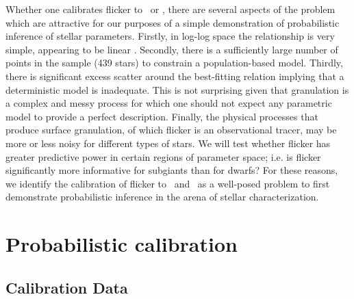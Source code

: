 Whether one calibrates flicker to \logg\ or \rhostar, there are several aspects
of the problem which are attractive for our purposes of a simple demonstration
of probabilistic inference of stellar parameters.
Firstly, in log-log space the relationship is very simple, appearing to be
linear \citep{Kipping2014}.
Secondly, there is a sufficiently large number of points in the sample (439
stars) to constrain a population-based model.
Thirdly, there is significant excess scatter around the best-fitting relation
implying that a deterministic model is inadequate.
This is not surprising given that granulation is a complex and messy process
for which one should not expect any parametric model to provide a perfect
description.
Finally, the physical processes that produce surface granulation, of which
flicker is an observational tracer, may be more or less noisy for different
types of stars.
We will test whether flicker has greater predictive power in certain regions
of parameter space; i.e. is flicker significantly more informative for
subgiants than for dwarfs?
For these reasons, we identify the calibration of
flicker to \logg\ and \rhostar\ as a well-posed problem to first demonstrate
probabilistic inference in the arena of stellar characterization.

\section{Probabilistic calibration}
\label{sec:HBM}

\subsection{Calibration Data}

